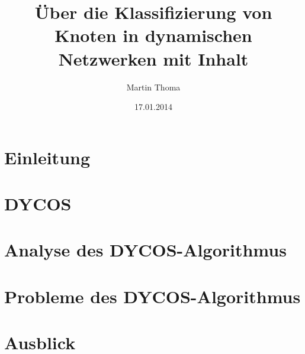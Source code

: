 \documentclass[runningheads]{llncs}
\begin{document}
\mainmatter
\title{Über die Klassifizierung von Knoten in dynamischen Netzwerken mit Inhalt}
\author{Martin Thoma}
\date{17.01.2014}
\maketitle

\begin{abstract}%

\end{abstract}

\section{Einleitung}


\section{DYCOS}


\section{Analyse des DYCOS-Algorithmus}


\section{Probleme des DYCOS-Algorithmus}


\section{Ausblick}


%


\end{document}
